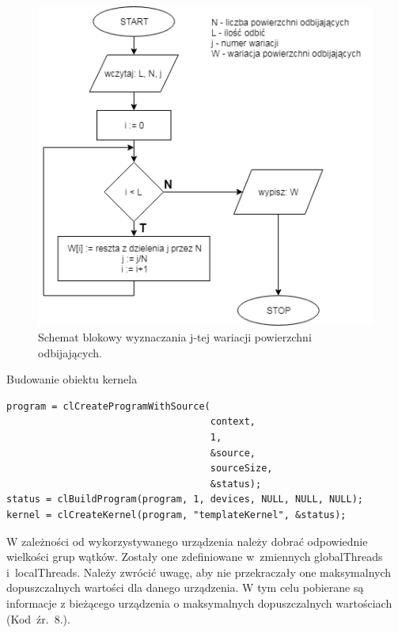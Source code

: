 \begin{figure}[H]
        \centering
                \centering
                \includegraphics[width=12cm]{wariacja}
	\caption{Schemat blokowy wyznaczania j-tej wariacji powierzchni odbijających.}
\end{figure}

\begin{program}[H]
\caption{Budowanie obiektu kernela}
\begin{lstlisting}
program = clCreateProgramWithSource(
                                    context, 
                                    1, 
                                    &source,
                                    sourceSize,
                                    &status);
status = clBuildProgram(program, 1, devices, NULL, NULL, NULL);
kernel = clCreateKernel(program, "templateKernel", &status);
\end{lstlisting}
\end{program}

W zależności od wykorzystywanego urządzenia należy dobrać odpowiednie wielkości grup wątków. Zostały one zdefiniowane w~zmiennych globalThreads i~localThreads. Należy zwrócić uwagę, aby nie przekraczały one maksymalnych dopuszczalnych wartości dla danego urządzenia. W tym celu pobierane są informacje z bieżącego urządzenia o maksymalnych dopuszczalnych wartościach (Kod~źr.~8.).

